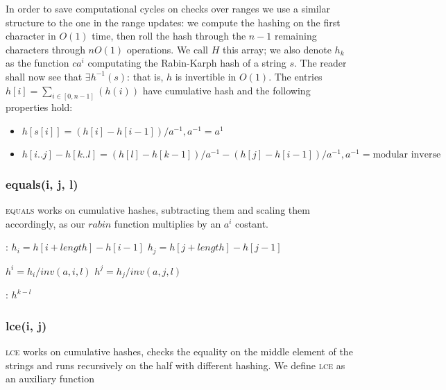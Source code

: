 \documentclass{article}
\begin{document}
In order to save computational cycles on checks over ranges we use a similar structure
to the one in the range updates: we compute the hashing on the first character in $O(1)$
time, then roll the hash through the $n - 1$ remaining characters through $n O(1)$
operations.
We call $H$ this array; we also denote $h_k$ as the function $c a^{i}$ computating
the Rabin-Karph hash of a string $s$.
The reader shall now see that $\exists h^{-1}(s)$: that is, $h$ is invertible in $O(1)$.
The entries $h[i] = \sum_{i \in [0, n - 1]}(h(i))$ have cumulative hash and the following
properties hold:
    \begin{itemize}
    \item $h[s[i]] = (h[i] - h[i - 1]) / a^{-1}, a^{-1} = a^{1}$
    \item $h[i..j] - h[k..l] = (h[l] - h[k - 1]) / a^{-1} -
            (h[j] - h[i - 1]) / a^{-1}, a^{-1} = \textrm{modular inverse}$
    \end{itemize}

\subsubsection{equals(i, j, l)}

\textsc{equals} works on cumulative hashes, subtracting them and scaling them
accordingly, as our $rabin$ function multiplies by an $a^{i}$ costant.

\begin{algorithmic}[1]
  :
    \State $h_i = h[i + length] - h[i - 1]$\;
    \State $h_j = h[j + length] - h[j - 1]$\;

    \State $h^{i} = h_i / inv(a, i, l)$\;
    \State $h^{j} = h_j / inv(a, j, l)$\;

    \;
    \EndFunction

    :
    \Return $h^{k - l}$
    \EndFunction
\end{algorithmic}

\subsubsection{lce(i, j)}

\textsc{lce} works on cumulative hashes, checks the equality on the middle element
of the strings and runs recursively on the half with different hashing.
We define \textsc{lce} as an auxiliary function
\end{document}
